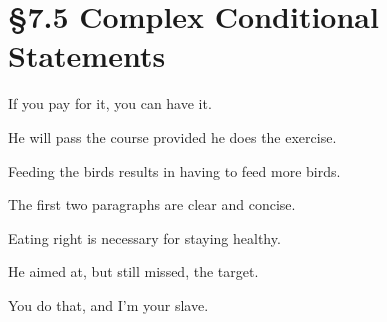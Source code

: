 % 
% 

\section{\S 7.5 Complex Conditional Statements}
\begin{enumerate}

	\begin{statement}{If you pay for it, you can have it.}
	\end{statement}

	\begin{statement}{He will pass the course provided he does the exercise.}
	\end{statement}

	\begin{statement}{Feeding the birds results in having to feed more birds.}
	\end{statement}

	\begin{statement}{The first two paragraphs are clear and concise.}
	\end{statement}

	\begin{statement}{Eating right is necessary for staying healthy.}
	\end{statement}

	\begin{statement}{He aimed at, but still missed, the target.}
	\end{statement}

	\begin{statement}{You do that, and I’m your slave.}
	\end{statement}


\end{enumerate}
